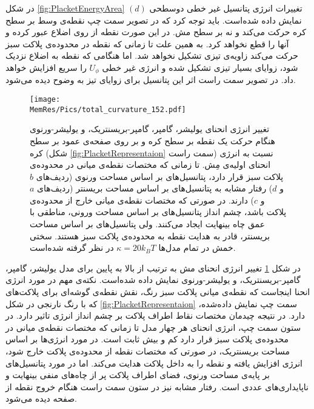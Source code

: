  در شکل 
\ref{fig:PlacketEnergyArea} $(d)$
تغییرات انرژی پتانسیل غیر خطی دوسطحی نمایش داده شده‌است. باید توجه کرد که در تصویر سمت چپ نقطه‌ی وسط بر سطح کره حرکت می‌کند و نه بر سطح مش. در این صورت نقطه از روی اضلاع عبور کرده و آنها را قطع نخواهد کرد. به همین علت تا زمانی که نقطه در محدوده‌ی پلاکت سبز حرکت می‌کند زاویه‌ی تیزی تشکیل نخواهد شد. اما هنگامی که نقطه به اضلاع نزدیک شود، زوایای بسیار تیزی تشکیل شده و انرژی غیر خطی
$U_\phi$
 را سریع افزایش خواهد داد. در تصویر سمت راست اثر این پتانسیل برای زوایای تیز به وضوح دیده می‌شود.


\begin{figure}[htbp]
\begin{center}
\texttt{[image: \\MemRes/Pics/total\_curvature\_152.pdf]}
\caption{
تغییر انرژی انحنای یولیشر، گامپر، گامپر-بریسنتریک، و یولیشر-ورنوی هنگام حرکت یک نقطه بر سطح کره و بر روی صفحه‌ی عمود بر سطح کره
(شکل
\ref{fig:PlacketRepresentaion}
سمت راست)
 نسبت به انرژی انحنای اولیه‌ی مِش.  تا زمانی که مختصات نقطه‌ی میانی در محدوده‌ی پلاکت سبز قرار دارد، پتانسیل‌های بر اساس مساحت ورنوی (ردیف‌های 
$b$
و
$d$)
 رفتار مشابه به پتانسیل‌های بر اساس مساحت بریسنتر (ردیف‌های 
$a$
و
$c$)
دارند. در صورتی که مختصات نقطه‌ی میانی خارج از محدوده‌ی پلاکت  باشد، چشم انداز پتانسیل‌های بر اساس مساحت ورونی، مناطقی با عمق چاه بینهایت ایجاد می‌کنند. ولی پتانسیل‌های بر اساس مساحت بریسنتر، قادر به هدایت نقطه به محدوده‌ی پلاکت سبز هستند. سختی خمش در تمام مدل‌ها 
$\kappa=20k_BT$
در نظر گرفته شده‌است.
}
\label{fig:PlacketEnergy}
\end{center}
\end{figure}


در شکل
\ref{fig:PlacketEnergy}
تغییر انرژی انحنای مش به ترتیب از بالا به پایین برای مدل یولیشر، گامپر، گامپر-بریسنتریک، و یولیشر-ورنوی نمایش داده شده‌است. نکته‌ی مهم در مورد انرژی انحنا اینجاست که نقطه‌ی میانی پلاکت سبز رنگ، نقش نقطه‌ی گوشه‌ای برای پلاکت‌های که با رنگ نارنجی در شکل
\ref{fig:PlacketRepresentaion}
سمت چپ نمایش داده‌شده، دارد. در نتیجه چیدمان مختصات نقاط اطراف پلاکت بر چشم انداز انرژی تاثیر دارد. در ستون سمت چپ، انرژی انحنای هر چهار مدل تا زمانی که مختصات نقطه‌ی میانی در محدود‌ه‌ی پلاکت سبز قرار دارد کم و بیش ثابت است. در مورد انرژی‌ها بر اساس مساحت بریسنتریک، در صورتی که مختصات نقطه از محدوده‌ی پلاکت خارج شود، انرژی افزایش یافته و نقطه را به داخل پلاکت هدایت می‌کند. اما در مورد پتانسیل‌های بر پایه‌ی مساحت ورنوی، فضای اطراف پلاکت پر از چاه‌های منفی بینهایت و ناپایداری‌های عددی‌ است. رفتار مشابه نیز در ستون سمت راست هنگام خروج نقطه از صفحه دیده می‌شود. 


